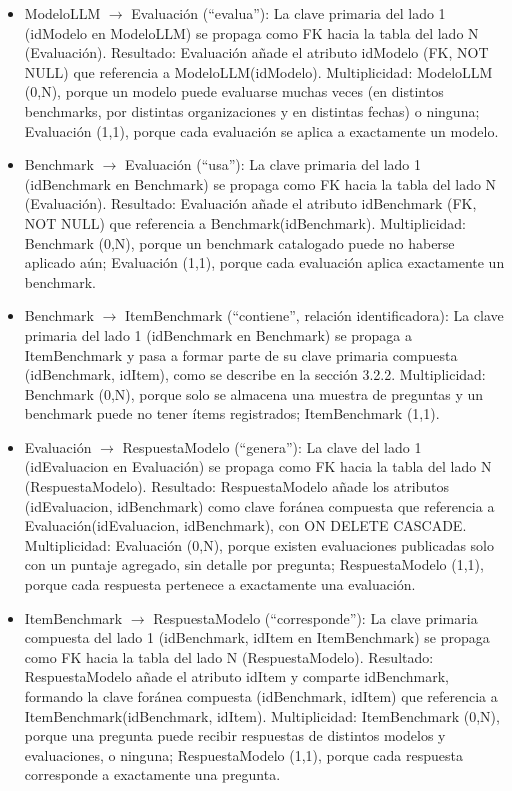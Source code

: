\documentclass[12pt,a4paper]{article}
\begin{document}
{\begin{itemize}
  \item ModeloLLM $\rightarrow$ Evaluación (``evalua''): La clave primaria del lado 1 (idModelo en ModeloLLM) se propaga como FK hacia la tabla del lado N (Evaluación).
  Resultado: Evaluación añade el atributo idModelo (FK, NOT NULL) que referencia a ModeloLLM(idModelo).
  Multiplicidad: ModeloLLM (0,N), porque un modelo puede evaluarse muchas veces (en distintos benchmarks, por distintas organizaciones y en distintas fechas) o ninguna; Evaluación (1,1), porque cada evaluación se aplica a exactamente un modelo.

  \item Benchmark $\rightarrow$ Evaluación (``usa''): La clave primaria del lado 1 (idBenchmark en Benchmark) se propaga como FK hacia la tabla del lado N (Evaluación).
  Resultado: Evaluación añade el atributo idBenchmark (FK, NOT NULL) que referencia a Benchmark(idBenchmark).
  Multiplicidad: Benchmark (0,N), porque un benchmark catalogado puede no haberse aplicado aún; Evaluación (1,1), porque cada evaluación aplica exactamente un benchmark.

  \item Benchmark $\rightarrow$ ItemBenchmark (``contiene'', relación identificadora): La clave primaria del lado 1 (idBenchmark en Benchmark) se propaga a ItemBenchmark y pasa a formar parte de su clave primaria compuesta (idBenchmark, idItem), como se describe en la sección 3.2.2.
  Multiplicidad: Benchmark (0,N), porque solo se almacena una muestra de preguntas y un benchmark puede no tener ítems registrados; ItemBenchmark (1,1).

  \item Evaluación $\rightarrow$ RespuestaModelo (``genera''): La clave del lado 1 (idEvaluacion en Evaluación) se propaga como FK hacia la tabla del lado N (RespuestaModelo).
  Resultado: RespuestaModelo añade los atributos (idEvaluacion, idBenchmark) como clave foránea compuesta que referencia a Evaluación(idEvaluacion, idBenchmark), con ON DELETE CASCADE.
  Multiplicidad: Evaluación (0,N), porque existen evaluaciones publicadas solo con un puntaje agregado, sin detalle por pregunta; RespuestaModelo (1,1), porque cada respuesta pertenece a exactamente una evaluación.

  \item ItemBenchmark $\rightarrow$ RespuestaModelo (``corresponde''): La clave primaria compuesta del lado 1 (idBenchmark, idItem en ItemBenchmark) se propaga como FK hacia la tabla del lado N (RespuestaModelo).
  Resultado: RespuestaModelo añade el atributo idItem y comparte idBenchmark, formando la clave foránea compuesta (idBenchmark, idItem) que referencia a ItemBenchmark(idBenchmark, idItem).
  Multiplicidad: ItemBenchmark (0,N), porque una pregunta puede recibir respuestas de distintos modelos y evaluaciones, o ninguna; RespuestaModelo (1,1), porque cada respuesta corresponde a exactamente una pregunta.
\end{itemize}
}
\end{document}
